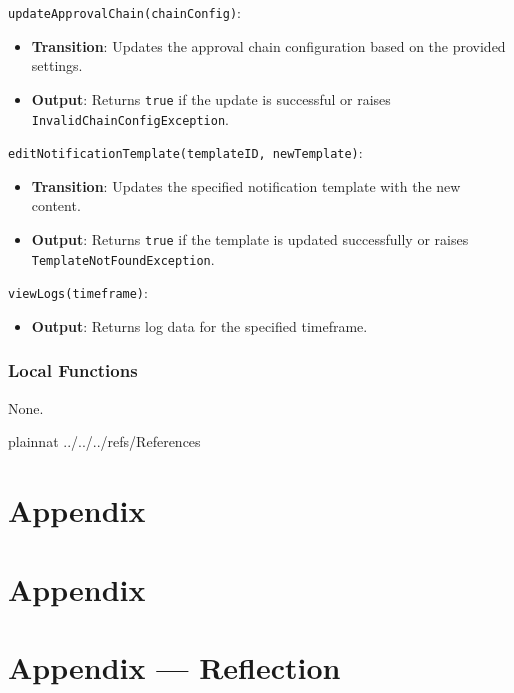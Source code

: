 \documentclass[12pt, titlepage]{article}
\begin{document}
\noindent \texttt{updateApprovalChain(chainConfig)}:
\begin{itemize}
    \item \textbf{Transition}: Updates the approval chain configuration based on the provided settings.
    \item \textbf{Output}: Returns \texttt{true} if the update is successful or raises \texttt{InvalidChainConfigException}.
\end{itemize}

\noindent \texttt{editNotificationTemplate(templateID, newTemplate)}:
\begin{itemize}
    \item \textbf{Transition}: Updates the specified notification template with the new content.
    \item \textbf{Output}: Returns \texttt{true} if the template is updated successfully or raises \texttt{TemplateNotFoundException}.
\end{itemize}

\noindent \texttt{viewLogs(timeframe)}:
\begin{itemize}
    \item \textbf{Output}: Returns log data for the specified timeframe.
\end{itemize}

\subsubsection{Local Functions}
None.


\newpage

 {plainnat}
 {../../../refs/References}

\newpage

\section{Appendix} \label{Appendix}


\newpage{}

\section{Appendix} \label{Appendix}


\newpage{}

\section*{Appendix --- Reflection}
\end{document}
